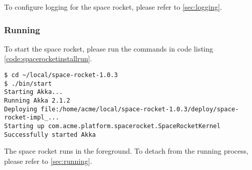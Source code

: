 To configure logging for the space rocket, please refer to
\ref{sec:logging}.

\subsubsection{Running}

To start the space rocket, please run the commands in code listing
\ref{code:spacerocketinstallrun}.

\begin{lstlisting}[label=code:spacerocketinstallrun,caption=Starting the
space rocket]
$ cd ~/local/space-rocket-1.0.3
$ ./bin/start
Starting Akka...
Running Akka 2.1.2
Deploying file:/home/acme/local/space-rocket-1.0.3/deploy/space-rocket-impl_...
Starting up com.acme.platform.spacerocket.SpaceRocketKernel
Successfully started Akka
\end{lstlisting}

The space rocket runs in the foreground. To detach from the running
process, please refer to \ref{sec:running}.
